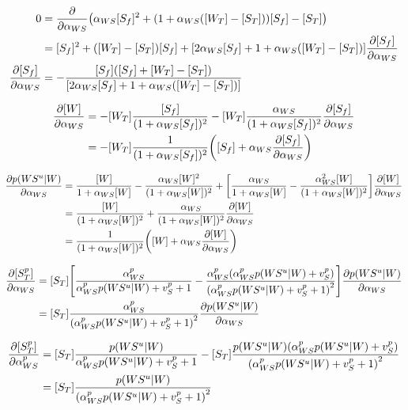 \documentclass[aps,onecolumn,superscriptaddress,notitlepage]{revtex4-1}
\begin{document}
\begin{align}
0 &= \pdv{}{\alpha_{WS}}\qty(\alpha_{WS}[S_f]^2 +  \qty(1+\alpha_{WS}([W_T]-[S_T]))[S_f] - [S_T])\\
&= [S_f]^2 +   ([W_T]-[S_T])[S_f] + \qty[2\alpha_{WS}[S_f] +   1+\alpha_{WS}([W_T]-[S_T])]\pdv{[S_f]}{\alpha_{WS}}\\
\pdv{[S_f]}{\alpha_{WS}} &= -\frac{[S_f]\qty([S_f] +   [W_T]-[S_T])}{ \qty[2\alpha_{WS}[S_f] +   1+\alpha_{WS}([W_T]-[S_T])]}
\end{align}

\begin{align}
\pdv{[W]}{\alpha_{WS}} &= -[W_T]\frac{[S_f]}{(1+\alpha_{WS}[S_f])^2}-[W_T]\frac{\alpha_{WS}}{(1+\alpha_{WS}[S_f])^2}\pdv{[S_f]}{\alpha_{WS}}\\
&= -[W_T]\frac{1}{(1+\alpha_{WS}[S_f])^2}\qty([S_f] + \alpha_{WS}\pdv{[S_f]}{\alpha_{WS}})
\end{align}

\begin{align}
\pdv{p(WS^u|W)}{\alpha_{WS}} &= \frac{[W]}{1+\alpha_{WS}[W]} - \frac{\alpha_{WS}[W]^2}{(1+\alpha_{WS}[W])^2} + \qty[\frac{\alpha_{WS}}{1+\alpha_{WS}[W]} - \frac{\alpha_{WS}^2[W]}{(1+\alpha_{WS}[W])^2}]\pdv{[W]}{\alpha_{WS}}\\
&= \frac{[W]}{(1+\alpha_{WS}[W])^2} + \frac{\alpha_{WS}}{(1+\alpha_{WS}[W])^2}\pdv{[W]}{\alpha_{WS}}\\
&= \frac{1}{(1+\alpha_{WS}[W])^2}\qty([W] + \alpha_{WS}\pdv{[W]}{\alpha_{WS}})
\end{align}

\begin{align}
\pdv{[S^p_T]}{\alpha_{WS}} &=  [S_T]\qty[\frac{\alpha_{WS}^p}{\alpha_{WS}^p p(WS^u|W) + v_S^p+1} -  \frac{\alpha_{WS}^p\qty(\alpha_{WS}^p p(WS^u|W) + v_S^p)}{\qty(\alpha_{WS}^p p(WS^u|W) + v_S^p+1)^2}]\pdv{p(WS^u|W)}{\alpha_{WS}}\\
&= [S_T] \frac{\alpha_{WS}^p}{\qty(\alpha_{WS}^p p(WS^u|W) + v_S^p+1)^2}\pdv{p(WS^u|W)}{\alpha_{WS}}
\end{align}

\begin{align}
\pdv{[S^p_T]}{\alpha_{WS}^p} &=  [S_T]\frac{ p(WS^u|W)}{\alpha_{WS}^p p(WS^u|W) + v_S^p+1} -  [S_T]\frac{p(WS^u|W)\qty(\alpha_{WS}^p p(WS^u|W) + v_S^p)}{\qty(\alpha_{WS}^p p(WS^u|W) + v_S^p+1)^2}\\
&= [S_T]\frac{p(WS^u|W)}{\qty(\alpha_{WS}^p p(WS^u|W) + v_S^p+1)^2}
\end{align}
\end{document}
